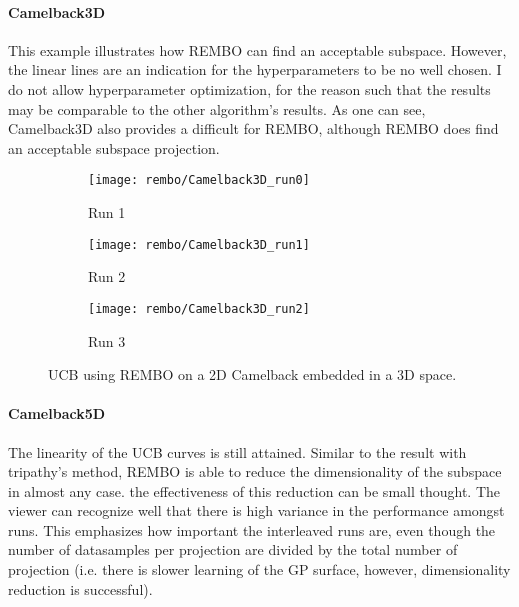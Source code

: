 \paragraph{Camelback3D}
This example illustrates how REMBO can find an acceptable subspace.
However, the linear lines are an indication for the hyperparameters to be no well chosen.
I do not allow hyperparameter optimization, for the reason such that the results may be comparable to the other algorithm's results.
As one can see, Camelback3D also provides a difficult for REMBO, although REMBO does find an acceptable subspace projection.

\begin{figure}[H]
\center
    \begin{subfigure}[b]{0.30\textwidth}
        \texttt{[image: rembo/Camelback3D\_run0]}
        \label{fig:gull}
         \caption{Run 1}
    \end{subfigure}
        \begin{subfigure}[b]{0.30\textwidth}
        \texttt{[image: rembo/Camelback3D\_run1]}
        \label{fig:gull}
        \caption{Run 2}
    \end{subfigure}
    \begin{subfigure}[b]{0.30\textwidth}
        \texttt{[image: rembo/Camelback3D\_run2]}
        \label{fig:gull}
               \caption{Run 3}
    \end{subfigure}
        \caption{UCB using REMBO on a 2D Camelback embedded in a 3D space.
    }\label{fig:animals}
\end{figure}

\paragraph{Camelback5D}
The linearity of the UCB curves is still attained.
Similar to the result with tripathy's method, REMBO is able to reduce the dimensionality of the subspace in almost any case.
the effectiveness of this reduction can be small thought.
The viewer can recognize well that there is high variance in the performance amongst runs.
This emphasizes how important the interleaved runs are, even though the number of datasamples per projection are divided by the total number of projection (i.e. there is slower learning of the GP surface, however, dimensionality reduction is successful).

